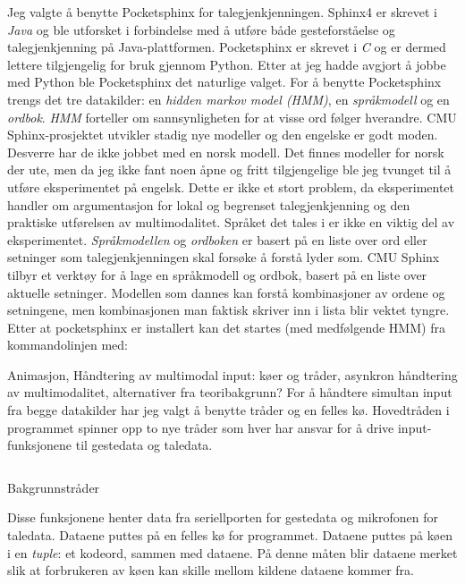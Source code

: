 Jeg valgte å benytte Pocketsphinx for talegjenkjenningen. Sphinx4 er skrevet i \emph{Java} og ble utforsket i forbindelse med å utføre både gesteforståelse og talegjenkjenning på Java-plattformen. Pocketsphinx er skrevet i \emph{C} og er dermed lettere tilgjengelig for bruk gjennom Python. Etter at jeg hadde avgjort å jobbe med Python ble Pocketsphinx det naturlige valget. For å benytte Pocketsphinx trengs det tre datakilder: en \emph{hidden markov model (HMM)}, en \emph{språkmodell} og en \emph{ordbok}. \emph{HMM} forteller om sannsynligheten for at visse ord følger hverandre. CMU Sphinx-prosjektet utvikler stadig nye modeller og den engelske er godt moden. Desverre har de ikke jobbet med en norsk modell. Det finnes modeller for norsk der ute, men da jeg ikke fant noen åpne og fritt tilgjengelige ble jeg tvunget til å utføre eksperimentet på engelsk. Dette er ikke et stort problem, da eksperimentet handler om argumentasjon for lokal og begrenset talegjenkjenning og den praktiske utførelsen av multimodalitet. Språket det tales i er ikke en viktig del av eksperimentet. \emph{Språkmodellen} og \emph{ordboken} er basert på en liste over ord eller setninger som talegjenkjenningen skal forsøke å forstå lyder som. CMU Sphinx tilbyr et verktøy for å lage en språkmodell og ordbok, basert på en liste over aktuelle setninger. Modellen som dannes kan forstå kombinasjoner av ordene og setningene, men kombinasjonen man faktisk skriver inn i lista blir vektet tyngre.  Etter at pocketsphinx er installert kan det startes (med medfølgende HMM) fra kommandolinjen med:\newline



{\color{red}Animasjon, Håndtering av multimodal input: køer og tråder, asynkron håndtering av multimodalitet, alternativer fra teoribakgrunn?}
For å håndtere simultan input fra begge datakilder har jeg valgt å benytte tråder og en felles kø. Hovedtråden i programmet spinner opp to nye tråder som hver har ansvar for å drive input-funksjonene til gestedata og taledata. 

\begin{listing}[ht]
\inputminted[fontsize=\footnotesize, linenos]{python}{kodesnutter/background_threads.py}
\label{code:backgroundthreads}
\caption{Bakgrunnstråder}
\end{listing}

Disse funksjonene henter data fra seriellporten for gestedata og mikrofonen for taledata. Dataene puttes på en felles kø for programmet. Dataene puttes på køen i en \emph{tuple}: et kodeord, sammen med dataene. På denne måten blir dataene merket slik at forbrukeren av køen kan skille mellom kildene dataene kommer fra.

